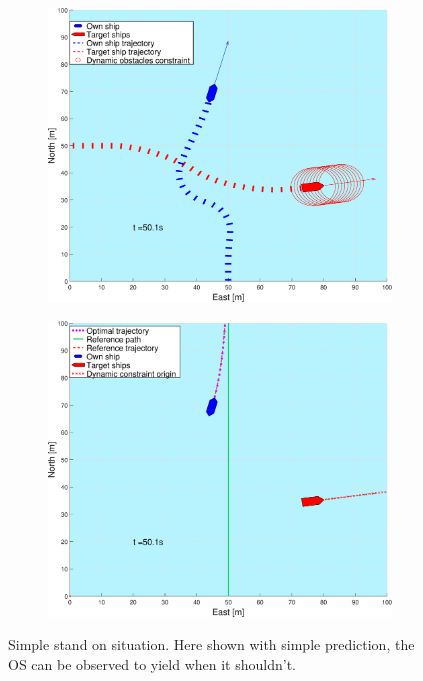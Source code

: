 \begin{figure}[ht!]
\begin{subfigure}[b]{0.499\textwidth}
        \subcaption{}
    \end{subfigure}
    \hfill
    \\
    \begin{subfigure}[b]{0.49\textwidth}
        \centering
        \includegraphics[width=\textwidth]{Images/Figures/enkel_SO/_Simple_1fig1_time=50}
        \subcaption{}
    \end{subfigure}
    \hfill
    \begin{subfigure}[b]{0.499\textwidth}
        \centering
        \includegraphics[width=\textwidth]{Images/Figures/enkel_SO/_Simple_1fig999_time=50}
        \subcaption{}
    \end{subfigure}
    \hfill
    \caption{Simple stand on situation. Here shown with simple prediction, the \gls{OS} can be observed to yield when it shouldn't.}
    \label{FIG: Simple SO simple pred}
\end{figure}%
